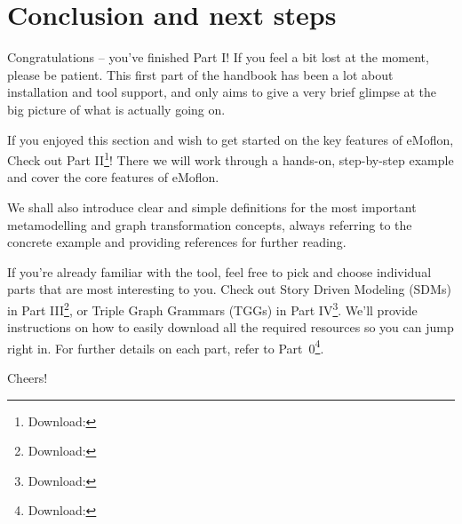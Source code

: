 \newpage
\hypertarget{conclusion}{} 
\section{Conclusion and next steps}
\genHeader

Congratulations -- you've finished Part I! If you feel a bit lost at the moment, please be patient. This first part of the handbook has been a lot about
installation and tool support, and only aims to give a very brief glimpse at the big picture of what is actually going on.

If you enjoyed this section and wish to get started on the key features of eMoflon, Check out Part II\footnote{Download: \dlPartTwo}! There we will work through a hands-on, step-by-step
example and cover the core features of eMoflon.

We shall also introduce clear and simple definitions for the most important metamodelling and graph transformation concepts, always referring to the concrete
example and providing references for further reading.

If you're already familiar with the tool, feel free to pick and choose individual parts that are most interesting to you. Check out Story Driven Modeling (SDMs)
in Part III\footnote{Download: \dlPartThree}, or Triple Graph Grammars (TGGs) in Part IV\footnote{Download: \dlPartFour}. We'll provide instructions on how to easily download all the required resources so you can jump
right in. For further details on each part, refer to Part~0\footnote{Download: \dlPartZero}.


Cheers!